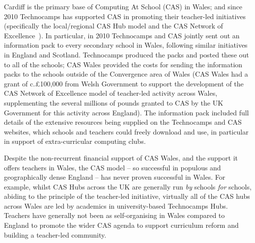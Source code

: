 \documentclass{sig-alternate}
\begin{document}
Cardiff is the primary base of Computing At School (CAS) in Wales;
and since 2010 Technocamps has supported CAS
in promoting their teacher-led initiatives
(specifically the local/regional CAS Hub model and the CAS Network of
Excellence~\cite{brown-et-al-toce2014,sentance-et-al-wipsce2014}).
In particular, in 2010 Technocamps and CAS jointly sent out an
information pack to every secondary school in Wales, following similar
initiatives in England and Scotland. Technocamps produced the packs
and posted these out to all of the schools; CAS Wales provided the
costs for sending the information packs to the schools outside of the
Convergence area of Wales (CAS Wales had a grant of c.\pounds100,000
from Welsh Government to support the development of the CAS Network of
Excellence model of teacher-led activity across Wales, supplementing
the several millions of pounds granted to CAS by the UK Government for
this activity across England).  The information pack included full
details of the extensive resources being supplied on the Technocamps
and CAS websites, which schools and teachers could freely download and
use, in particular in support of extra-curricular computing clubs.

 

Despite the non-recurrent financial support of CAS Wales, and the
support it offers teachers in Wales, the CAS model -- so successful in
populous and geographically dense England -- has never proven
successful in Wales.  For example, whilst CAS Hubs across the UK are
generally run \emph{by} schools \emph{for} schools, abiding to the
principle of the teacher-led initiative, virtually all of the CAS hubs
across Wales are led by academics in university-based Technocamps Hubs.
Teachers have generally not been as self-organising in Wales compared
to England to promote the wider CAS agenda to support
curriculum reform and building a teacher-led community.
\end{document}
